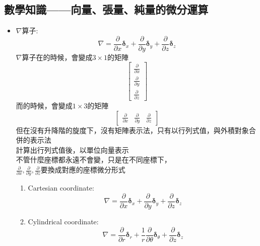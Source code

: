 \documentclass[../main.tex]{subfiles}
\begin{document}
\subsection{數學知識——向量、張量、純量的微分運算}
\begin{itemize}
  \item $\nabla$算子:
    \begin{equation}
      \nabla = \frac{\partial }{\partial x}\bm \delta_x + \frac{\partial }{\partial y}\bm \delta_y + \frac{\partial }{\partial z}\bm \delta_z
    \end{equation}
    $\nabla$算子在的時候，會變成$\boxed{3\times 1}$的矩陣
    \begin{equation}
      \begin{bmatrix}
        \frac{\partial }{\partial x}\\
        \frac{\partial }{\partial y}\\
        \frac{\partial }{\partial z}
      \end{bmatrix}
    \end{equation}
    而的時候，會變成$\boxed{1\times 3}$的矩陣
    \begin{equation}
      \begin{bmatrix}
        \frac{\partial }{\partial x} & \frac{\partial }{\partial y} & \frac{\partial }{\partial z}
      \end{bmatrix}
    \end{equation}
    但在沒有升降階的旋度下，沒有矩陣表示法，只有以行列式值，與外積對象合併的表示法\\
    計算出行列式值後，以單位向量表示\\
    不管什麼座標都永遠不會變，只是在不同座標下，\\
    $\frac{\partial }{\partial x},\frac{\partial }{\partial y},\frac{\partial }{\partial z}$要換成對應的座標微分形式
    \begin{enumerate}
      \item Cartesian coordinate:
      \begin{equation}
        \nabla = \frac{\partial }{\partial x}\bm \delta_x + \frac{\partial }{\partial y}\bm \delta_y + \frac{\partial }{\partial z}\bm \delta_z
      \end{equation}
      \item Cylindrical coordinate:
      \begin{equation}
        \nabla = \frac{\partial }{\partial r}\bm \delta_r + \frac{1}{r}\frac{\partial }{\partial \theta}\bm \delta_{\theta} + \frac{\partial }{\partial z}\bm \delta_z

\end{equation}
\end{enumerate}
\end{itemize}
\end{document}
